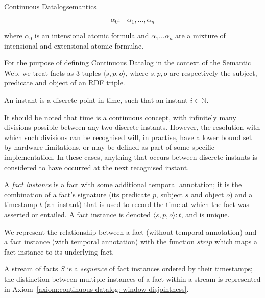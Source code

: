 \begin{nestedsection}{Continuous Datalog}{semantics}
\begin{definition}
\[\alpha_0 :- \alpha_1 , \ldots , \alpha_n\]

\noindent where $\alpha_0$ is an intensional atomic formula and
$\alpha_1 \ldots \alpha_n$ are a mixture of intensional and
extensional atomic formulae.

For the purpose of defining Continuous Datalog in the context of the
Semantic Web, we treat facts as 3-tuples $\langle s, p, o \rangle$,
where $s, p, o$ are respectively the subject, predicate and object of
an RDF triple. 
\end{definition}

\begin{definition}[Instant]
\label{def:continuous datalog: instant}
An instant is a discrete point in time, such that an instant 
${i \in \mathbb{N}}$.

It should be noted that time is a continuous concept, with infinitely
many divisions possible between any two discrete instants.  However,
the resolution with which such divisions can be recognised will, in
practise, have a lower bound set by hardware limitations, or may be
defined as part of some specific implementation.  In these cases,
anything that occurs between discrete instants is considered to have
occurred at the next recognised instant.
\end{definition}

\begin{definition}
\label{def:continuous datalog: fact instance}
A {\em fact instance} is a fact with some additional temporal
annotation; it is the combination of a fact's signature (its predicate
$p$, subject $s$ and object $o$) and a timestamp $t$ (an instant) that
is used to record the time at which the fact was asserted or
entailed. A fact instance is denoted $\langle s, p, o \rangle \! : \!
t$, and is unique.

We represent the relationship between a fact (without temporal
annotation) and a fact instance (with temporal annotation) with the
function $strip$ which maps a fact instance to its underlying fact.
\end{definition}

\begin{definition}
\label{def:continuous datalog: stream}
A stream of facts $S$ is a \emph{sequence} of fact instances ordered
by their timestamps; the distinction between multiple instances of a
fact within a stream is represented in 
Axiom~\ref{axiom:continuous datalog: window disjointness}.
\end{definition}


\end{nestedsection}
